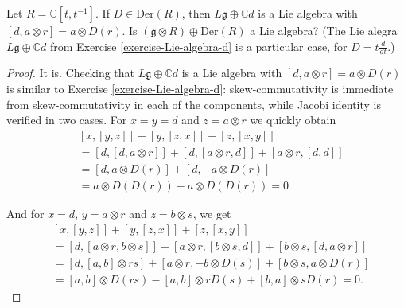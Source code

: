 \begin{exercise}
\label{exercise-for-those-who-like-geometry}
Let $R=\mathbb{C}[t,t^{-1}]$. 
If $D \in \text{Der}(R)$, then
$L\mathfrak{g} \oplus \mathbb{C}d$ is a Lie algebra with 
$[d,a \otimes r]=a\otimes D(r)$. 
Is $(\mathfrak{g}\otimes R)\oplus \text{Der}(R)$ a Lie algebra? (The Lie alegra
$L\mathfrak{g} \oplus \mathbb{C}d$ from Exercise \ref{exercise-Lie-algebra-d} is
a particular case, for $D=t\frac{d}{dt}$.)
\end{exercise}

\begin{proof}
It is. Checking that $L\mathfrak{g} \oplus \mathbb{C}d$ is a Lie algebra with 
$[d,a\otimes r]=a \otimes D(r)$ is similar to Exercise
\ref{exercise-Lie-algebra-d}: skew-commutativity is immediate from
skew-commutativity in each of the components, while 
Jacobi identity is verified in two cases. For $x=y=d$ and $z=a \otimes r$ 
we quickly obtain
\begin{align*}
&[x,[y,z]]+[y,[z,x]]+[z,[x,y]]\\
&=[d,[d,a \otimes r]]+[d,[a \otimes r,d]]+[a \otimes r,[d,d]]\\
&=[d,a \otimes D(r)]+[d,-a \otimes D(r)]\\
&=a \otimes D(D(r))-a \otimes D(D(r))=0
\end{align*}

And for $x=d$, $y=a \otimes r$ and $z=b \otimes s$, we get
\begin{equation}
\label{equation-Jacobi-derivation}
\begin{aligned}
&[x,[y,z]]+[y,[z,x]]+[z,[x,y]]\\
&=[d,[a\otimes r,b \otimes s]]+[a\otimes r,[b \otimes s,d]]
+[b \otimes s,[d,a\otimes r]]\\
&=[d,[a,b]\otimes rs]+[a\otimes r,-b\otimes D(s)]
+[b\otimes s,a\otimes D(r)]\\
&=[a,b]\otimes D(rs)-[a,b]\otimes rD(s)+[b,a]\otimes sD(r)=0.
\end{aligned}
\end{equation}


\end{proof}
